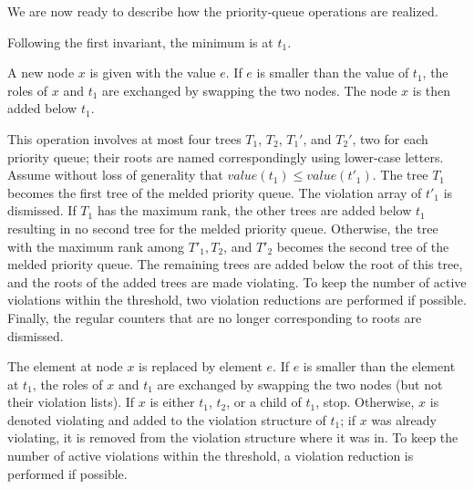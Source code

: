 \documentclass{llncs}
\newcommand{\Findmin}{\mbox{$\mathit{find}$\mbox{\rm -}$\mathit{min}$}}
\newcommand{\Insert}{\mbox{$\mathit{insert}$}}
\newcommand{\Decrease}{\mbox{$\mathit{decrease}$}}
\newcommand{\Meld}{\mbox{$\mathit{meld}$}}
\begin{document}
We are now ready to describe how the priority-queue operations are realized.
\begin{description}
\vspace{-.05in}
\item[\Findmin{}$(Q)$:] Following the first invariant, the minimum is at $t_1$.

\item[\Insert{}$(Q,x)$:] A new node $x$ is given with the value
  $e$. If $e$ is smaller than the value of $t_1$, the
  roles of $x$ and $t_1$ are exchanged by swapping the two nodes. The
  node $x$ is then added below $t_1$.

\item[\Meld{}$(Q, Q')$:] This operation involves at most four trees $T_1$, $T_2$, $T_1'$, and $T_2'$,
  two for each priority queue; their roots are named correspondingly using lower-case letters. 
  Assume without loss of generality that $value(t_1) \leq value(t'_1)$.
  The tree $T_1$ becomes the first tree of the melded priority queue.  
  The violation array of $t'_1$ is dismissed.  
  If $T_1$ has the maximum rank, the other trees are added below $t_1$ 
  resulting in no second tree for the melded priority queue.  
  Otherwise, the tree with the maximum rank among $T'_1, T_2$, and $T'_2$
  becomes the second tree of the melded priority queue. The remaining trees are
  added below the root of this tree, and
  the roots of the added trees are made violating. To keep the number
  of active violations within the threshold, two violation
  reductions are performed if possible. Finally, the regular counters
  that are no longer corresponding to roots are dismissed.

\item[\Decrease{}$(Q,x,e)$:] The element at node $x$ is replaced by
  element $e$. If $e$ is smaller than the element at $t_1$, the roles
  of $x$ and $t_1$ are exchanged by swapping the two nodes (but not
  their violation lists).  If $x$ is either $t_1$, $t_2$, or a
  child of $t_1$, stop.  Otherwise, $x$ is denoted violating and added
  to the violation structure of $t_1$; if $x$ was already violating,
  it is removed from the violation structure where it was in.  To keep
  the number of active violations within the threshold, a violation
  reduction is performed if possible.


\end{description}
\end{document}
